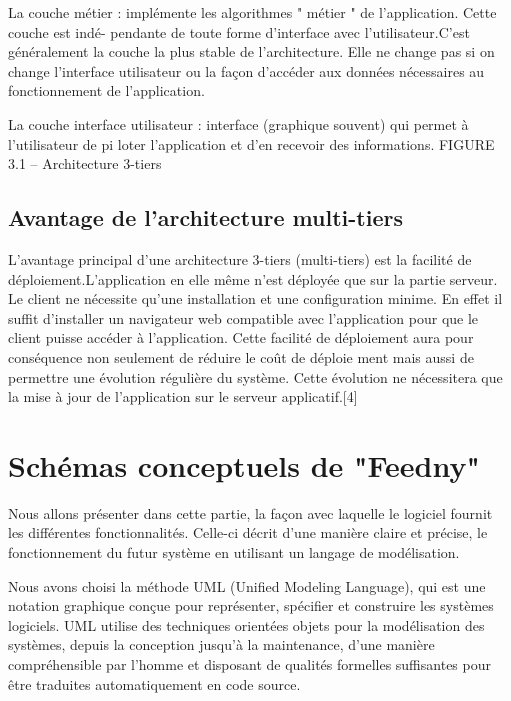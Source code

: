 La couche métier : implémente les algorithmes " métier " de l’application. Cette couche est indé-
pendante de toute forme d’interface avec l’utilisateur.C’est généralement la couche la plus
stable de l’architecture. Elle ne change pas si on change l’interface utilisateur ou la façon
d’accéder aux données nécessaires au fonctionnement de l’application.

La couche interface utilisateur : interface (graphique souvent) qui permet à l’utilisateur de pi
loter l’application et d’en recevoir des informations.
FIGURE 3.1 – Architecture 3-tiers


\subsection{Avantage de l’architecture multi-tiers}
L’avantage principal d’une architecture 3-tiers (multi-tiers) est la facilité de déploiement.L’application
en elle même n’est déployée que sur la partie serveur.
Le client ne nécessite qu’une installation et une configuration minime.
En effet il suffit d’installer un navigateur web compatible avec l’application pour que le client
puisse accéder à l’application.
Cette facilité de déploiement aura pour conséquence non seulement de réduire le coût de déploie
ment mais aussi de permettre une évolution régulière du système. Cette évolution ne nécessitera
que la mise à jour de l’application sur le serveur applicatif.[4]









\section{Schémas conceptuels de "Feedny"}
Nous allons présenter dans cette partie, la façon avec laquelle le logiciel fournit les différentes fonctionnalités. Celle-ci décrit d'une manière claire et précise, le fonctionnement du futur système en utilisant un langage de modélisation. 

Nous avons choisi la méthode UML (Unified Modeling Language), qui est une notation graphique conçue pour représenter, spécifier et construire les systèmes logiciels. UML utilise des techniques orientées objets pour la modélisation des systèmes, depuis la conception jusqu'à la maintenance, d'une manière compréhensible par l'homme et disposant de qualités formelles suffisantes pour être traduites automatiquement en code source.\cite{UML}

